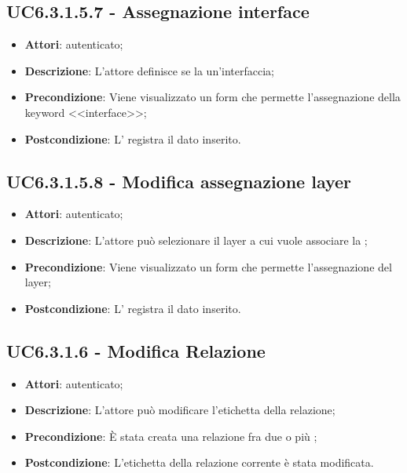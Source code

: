\subsection{UC6.3.1.5.7 - Assegnazione interface}
\label{ssec:UC6.3.1.5.7}
\begin{itemize}
\item \textbf{Attori}:  autenticato;
\item \textbf{Descrizione}: L'attore definisce se la  un'interfaccia;
\item \textbf{Precondizione}: Viene visualizzato un form che permette l'assegnazione della keyword <<interface>>;
\item \textbf{Postcondizione}: L' registra il dato inserito.
\end{itemize}
\subsection{UC6.3.1.5.8 - Modifica assegnazione layer}
\label{ssec:UC6.3.1.5.8}
\begin{itemize}
\item \textbf{Attori}:  autenticato;
\item \textbf{Descrizione}: L'attore può selezionare il layer a cui vuole associare la ;
\item \textbf{Precondizione}: Viene visualizzato un form che permette l'assegnazione del layer;
\item \textbf{Postcondizione}: L' registra il dato inserito.
\end{itemize}
\subsection{UC6.3.1.6 - Modifica Relazione}
\label{ssec:UC6.3.1.6}
\begin{itemize}
\item \textbf{Attori}:  autenticato;
\item \textbf{Descrizione}: L'attore può modificare l'etichetta della relazione;
\item \textbf{Precondizione}: È stata creata una relazione fra due o più ;
\item \textbf{Postcondizione}: L'etichetta della relazione corrente è stata modificata.
\end{itemize}
